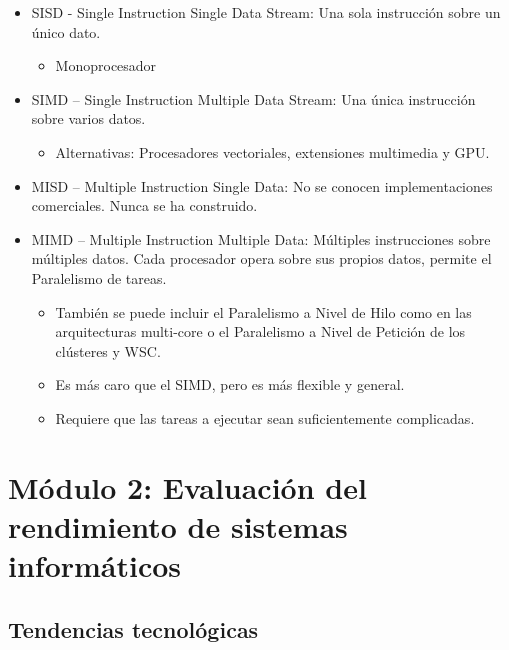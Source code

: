 \documentclass[12pt, twoside, openright]{report} %
\begin{document}
  \begin{itemize}
  
  \item
    SISD - Single Instruction Single Data Stream: Una sola instrucción
    sobre un único dato.

    \begin{itemize}
    
    \item
      Monoprocesador
    \end{itemize}
  \item
    SIMD -- Single Instruction Multiple Data Stream: Una única
    instrucción sobre varios datos.

    \begin{itemize}
    
    \item
      Alternativas: Procesadores vectoriales, extensiones multimedia y
      GPU.
    \end{itemize}
  \item
    MISD -- Multiple Instruction Single Data: No se conocen
    implementaciones comerciales. Nunca se ha construido.
  \item
    MIMD -- Multiple Instruction Multiple Data: Múltiples instrucciones
    sobre múltiples datos. Cada procesador opera sobre sus propios
    datos, permite el Paralelismo de tareas.

    \begin{itemize}
    
    \item
      También se puede incluir el Paralelismo a Nivel de Hilo como en
      las arquitecturas multi-core o el Paralelismo a Nivel de Petición
      de los clústeres y WSC.
    \item
      Es más caro que el SIMD, pero es más flexible y general.
    \item
      Requiere que las tareas a ejecutar sean suficientemente
      complicadas.
    \end{itemize}
  \end{itemize}

  \chapter{Módulo 2: Evaluación del rendimiento de sistemas informáticos}
  \section{Tendencias tecnológicas}
\end{document}
